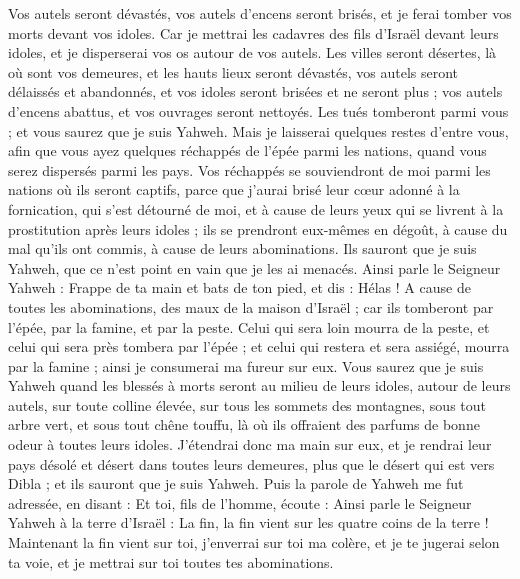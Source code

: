 \begin{multicols}{2}
Vos autels seront dévastés, vos autels d'encens seront brisés, et je ferai tomber vos morts devant vos idoles.
Car je mettrai les cadavres des fils d'Israël devant leurs idoles, et je disperserai vos os autour de vos autels.
Les villes seront désertes, là où sont vos demeures, et les hauts lieux seront dévastés, vos autels seront délaissés et abandonnés, et vos idoles seront brisées et ne seront plus ; vos autels d'encens abattus, et vos ouvrages seront nettoyés.
Les tués tomberont parmi vous ; et vous saurez que je suis Yahweh.
Mais je laisserai quelques restes d'entre vous, afin que vous ayez quelques réchappés de l'épée parmi les nations, quand vous serez dispersés parmi les pays.
Vos réchappés se souviendront de moi parmi les nations où ils seront captifs, parce que j'aurai brisé leur cœur adonné à la fornication, qui s'est détourné de moi, et à cause de leurs yeux qui se livrent à la prostitution après leurs idoles ; ils se prendront eux-mêmes en dégoût, à cause du mal qu'ils ont commis, à cause de leurs abominations.
Ils sauront que je suis Yahweh, que ce n'est point en vain que je les ai menacés.
Ainsi parle le Seigneur Yahweh : Frappe de ta main et bats de ton pied, et dis : Hélas ! A cause de toutes les abominations, des maux de la maison d'Israël ; car ils tomberont par l'épée, par la famine, et par la peste.
Celui qui sera loin mourra de la peste, et celui qui sera près tombera par l'épée ; et celui qui restera et sera assiégé, mourra par la famine ; ainsi je consumerai ma fureur sur eux.
Vous saurez que je suis Yahweh quand les blessés à morts seront au milieu de leurs idoles, autour de leurs autels, sur toute colline élevée, sur tous les sommets des montagnes, sous tout arbre vert, et sous tout chêne touffu, là où ils offraient des parfums de bonne odeur à toutes leurs idoles.
J'étendrai donc ma main sur eux, et je rendrai leur pays désolé et désert dans toutes leurs demeures, plus que le désert qui est vers Dibla ; et ils sauront que je suis Yahweh.
\VerseOne{}Puis la parole de Yahweh me fut adressée, en disant :
Et toi, fils de l'homme, écoute : Ainsi parle le Seigneur Yahweh à la terre d'Israël : La fin, la fin vient sur les quatre coins de la terre !
Maintenant la fin vient sur toi, j'enverrai sur toi ma colère, et je te jugerai selon ta voie, et je mettrai sur toi toutes tes abominations.

\end{multicols}
